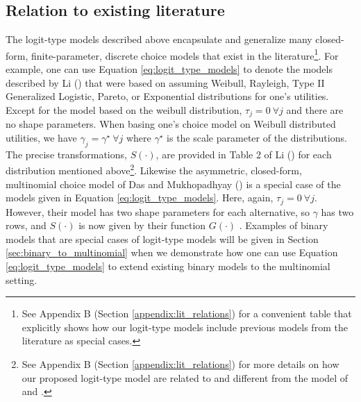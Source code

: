 \subsection{Relation to existing literature}
\label{sec:logit_type_literature_relation}
The logit-type models described above encapsulate and generalize many closed-form, finite-parameter, discrete choice models that exist in the literature\footnote{See Appendix B (Section \ref{appendix:lit_relations}) for a convenient table that explicitly shows how our logit-type models include previous models from the literature as special cases.}. For example, one can use Equation \ref{eq:logit_type_models} to denote the models described by Li (\citeyear{li_multinomial_2011}) that were based on assuming Weibull, Rayleigh, Type II Generalized Logistic, Pareto, or Exponential distributions for one's utilities. Except for the model based on the weibull distribution, $\tau_j = 0 \ \forall j$  and there are no shape parameters. When basing one's choice model on Weibull distributed utilities, we have $\gamma _j = \gamma^{ \star } \ \forall j$ where $\gamma^{\star}$ is the scale parameter of the distributions. The precise transformations, $S \left( \cdot \right)$, are provided in Table 2 of Li (\citeyear{li_multinomial_2011}) for each distribution mentioned above\footnote{See Appendix B (Section \ref{appendix:lit_relations}) for more details on how our proposed logit-type model are related to and different from the model of \citet{li_multinomial_2011} and \citet{das_generalized_2014}.}. Likewise the asymmetric, closed-form, multinomial choice model of Das and Mukhopadhyay (\citeyear{das_generalized_2014}) is a special case of the models given in Equation \ref{eq:logit_type_models}. Here, again, $\tau_j = 0 \ \forall j$. However, their model has two shape parameters for each alternative, so $\gamma$ has two rows, and $S \left( \cdot \right)$ is now given by their function $G \left( \cdot \right)$ \citep{das_generalized_2014}. Examples of binary models that are special cases of logit-type models will be given in Section \ref{sec:binary_to_multinomial} when we demonstrate how one can use Equation \ref{eq:logit_type_models} to extend existing binary models to the multinomial setting.

